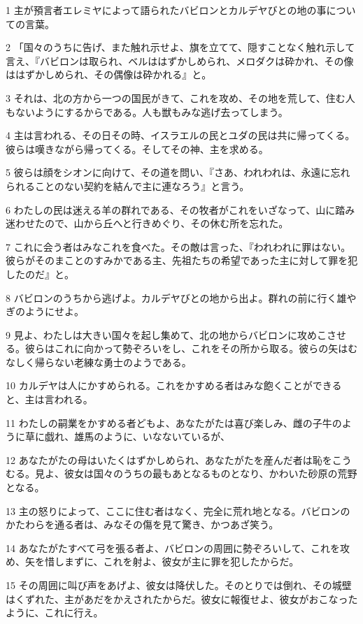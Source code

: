\par 1 主が預言者エレミヤによって語られたバビロンとカルデヤびとの地の事についての言葉。
\par 2 「国々のうちに告げ、また触れ示せよ、旗を立てて、隠すことなく触れ示して言え、『バビロンは取られ、ベルははずかしめられ、メロダクは砕かれ、その像ははずかしめられ、その偶像は砕かれる』と。
\par 3 それは、北の方から一つの国民がきて、これを攻め、その地を荒して、住む人もないようにするからである。人も獣もみな逃げ去ってしまう。
\par 4 主は言われる、その日その時、イスラエルの民とユダの民は共に帰ってくる。彼らは嘆きながら帰ってくる。そしてその神、主を求める。
\par 5 彼らは顔をシオンに向けて、その道を問い、『さあ、われわれは、永遠に忘れられることのない契約を結んで主に連なろう』と言う。
\par 6 わたしの民は迷える羊の群れである、その牧者がこれをいざなって、山に踏み迷わせたので、山から丘へと行きめぐり、その休む所を忘れた。
\par 7 これに会う者はみなこれを食べた。その敵は言った、『われわれに罪はない。彼らがそのまことのすみかである主、先祖たちの希望であった主に対して罪を犯したのだ』と。
\par 8 バビロンのうちから逃げよ。カルデヤびとの地から出よ。群れの前に行く雄やぎのようにせよ。
\par 9 見よ、わたしは大きい国々を起し集めて、北の地からバビロンに攻めこさせる。彼らはこれに向かって勢ぞろいをし、これをその所から取る。彼らの矢はむなしく帰らない老練な勇士のようである。
\par 10 カルデヤは人にかすめられる。これをかすめる者はみな飽くことができると、主は言われる。
\par 11 わたしの嗣業をかすめる者どもよ、あなたがたは喜び楽しみ、雌の子牛のように草に戯れ、雄馬のように、いなないているが、
\par 12 あなたがたの母はいたくはずかしめられ、あなたがたを産んだ者は恥をこうむる。見よ、彼女は国々のうちの最もあとなるものとなり、かわいた砂原の荒野となる。
\par 13 主の怒りによって、ここに住む者はなく、完全に荒れ地となる。バビロンのかたわらを通る者は、みなその傷を見て驚き、かつあざ笑う。
\par 14 あなたがたすべて弓を張る者よ、バビロンの周囲に勢ぞろいして、これを攻め、矢を惜しまずに、これを射よ、彼女が主に罪を犯したからだ。
\par 15 その周囲に叫び声をあげよ、彼女は降伏した。そのとりでは倒れ、その城壁はくずれた、主があだをかえされたからだ。彼女に報復せよ、彼女がおこなったように、これに行え。
